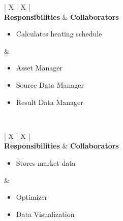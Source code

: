 \vspace{1.5em} %

\noindent
\begin{tabularx}{\textwidth}{| X | X |}
    \hline
     \\
    \hline
    \textbf{Responsibilities} & \textbf{Collaborators} \\
    \hline
    \begin{itemize}[leftmargin=*, nosep, before=\vspace{-0.2\baselineskip}]
        \item Calculates heating schedule
    \end{itemize} & 
    \begin{itemize}[leftmargin=*, nosep, before=\vspace{-0.2\baselineskip}]
        \item Asset Manager
        \item Source Data Manager
        \item Result Data Manager
    \end{itemize} \\
    \hline
\end{tabularx}

\vspace{1.5em}

\noindent
\begin{tabularx}{\textwidth}{| X | X |}
    \hline
     \\
    \hline
    \textbf{Responsibilities} & \textbf{Collaborators} \\
    \hline
    \begin{itemize}[leftmargin=*, nosep, before=\vspace{-0.2\baselineskip}]
        \item Stores market data
    \end{itemize} & 
    \begin{itemize}[leftmargin=*, nosep, before=\vspace{-0.2\baselineskip}]
        \item Optimizer
        \item Data Visualization
    \end{itemize} \\
    \hline
\end{tabularx}

